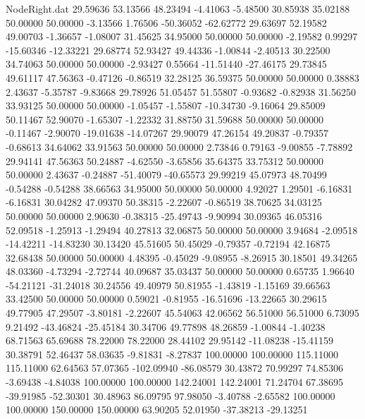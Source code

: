 \begin{filecontents}{NodeRight.dat}
  29.59636   53.13566   48.23494    -4.41063   -5.48500   30.85938   35.02188   50.00000   50.00000   -3.13566    1.76506  -50.36052  -62.62772
  29.63697   52.19582   49.00703    -1.36657   -1.08007   31.45625   34.95000   50.00000   50.00000   -2.19582    0.99297  -15.60346  -12.33221
  29.68774   52.93427   49.44336    -1.00844   -2.40513   30.22500   34.74063   50.00000   50.00000   -2.93427    0.55664  -11.51440  -27.46175
  29.73845   49.61117   47.56363    -0.47126   -0.86519   32.28125   36.59375   50.00000   50.00000    0.38883    2.43637   -5.35787   -9.83668
  29.78926   51.05457   51.55807    -0.93682   -0.82938   31.56250   33.93125   50.00000   50.00000   -1.05457   -1.55807  -10.34730   -9.16064
  29.85009   50.11467   52.90070    -1.65307   -1.22332   31.88750   31.59688   50.00000   50.00000   -0.11467   -2.90070  -19.01638  -14.07267
  29.90079   47.26154   49.20837    -0.79357   -0.68613   34.64062   33.91563   50.00000   50.00000    2.73846    0.79163   -9.00855   -7.78892
  29.94141   47.56363   50.24887    -4.62550   -3.65856   35.64375   33.75312   50.00000   50.00000    2.43637   -0.24887  -51.40079  -40.65573
  29.99219   45.07973   48.70499    -0.54288   -0.54288   38.66563   34.95000   50.00000   50.00000    4.92027    1.29501   -6.16831   -6.16831
  30.04282   47.09370   50.38315    -2.22607   -0.86519   38.70625   34.03125   50.00000   50.00000    2.90630   -0.38315  -25.49743   -9.90994
  30.09365   46.05316   52.09518    -1.25913   -1.29494   40.27813   32.06875   50.00000   50.00000    3.94684   -2.09518  -14.42211  -14.83230
  30.13420   45.51605   50.45029    -0.79357   -0.72194   42.16875   32.68438   50.00000   50.00000    4.48395   -0.45029   -9.08955   -8.26915
  30.18501   49.34265   48.03360    -4.73294   -2.72744   40.09687   35.03437   50.00000   50.00000    0.65735    1.96640  -54.21121  -31.24018
  30.24556   49.40979   50.81955    -1.43819   -1.15169   39.66563   33.42500   50.00000   50.00000    0.59021   -0.81955  -16.51696  -13.22665
  30.29615   49.77905   47.29507    -3.80181   -2.22607   45.54063   42.06562   56.51000   56.51000    6.73095    9.21492  -43.46824  -25.45184
  30.34706   49.77898   48.26859    -1.00844   -1.40238   68.71563   65.69688   78.22000   78.22000   28.44102   29.95142  -11.08238  -15.41159
  30.38791   52.46437   58.03635    -9.81831   -8.27837  100.00000  100.00000  115.11000  115.11000   62.64563   57.07365 -102.09940  -86.08579
  30.43872   70.99297   74.85306    -3.69438   -4.84038  100.00000  100.00000  142.24001  142.24001   71.24704   67.38695  -39.91985  -52.30301
  30.48963   86.09795   97.98050    -3.40788   -2.65582  100.00000  100.00000  150.00000  150.00000   63.90205   52.01950  -37.38213  -29.13251

\end{filecontents}
